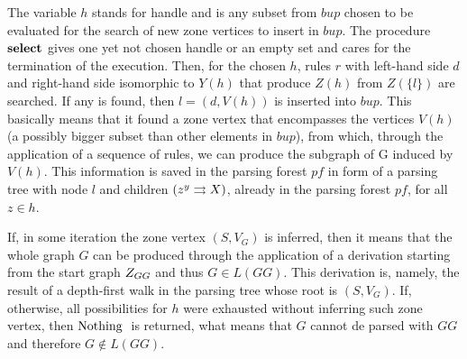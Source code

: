 The variable $h$ stands for handle and is any subset from $bup$ chosen to be evaluated for the search of new zone vertices to insert in $bup$. The procedure $\textbf{select}$ gives one yet not chosen handle or an empty set and cares for the termination of the execution. Then, for the chosen $h$, rules $r$ with left-hand side $d$ and right-hand side isomorphic to $Y(h)$ that produce $Z(h)$ from $Z(\{l\})$ are searched. If any is found, then $l = (d,V(h))$ is inserted into $bup$. This basically means that it found a zone vertex that encompasses the vertices $V(h)$ (a possibly bigger subset than other elements in $bup$), from which, through the application of a sequence of rules, we can produce the subgraph of G induced by $V(h)$. This information is saved in the parsing forest $pf$ in form of a parsing tree with node $l$ and children $\ptree{z}{y}{X}$, already in the parsing forest $pf$, for all $z \in h$.

If, in some iteration the zone vertex $(S, V_G)$ is inferred, then it means that the whole graph $G$ can be produced through the application of a derivation starting from the start graph $Z_{GG}$ and thus $G \in L(GG)$. This derivation is, namely, the result of a depth-first walk in the parsing tree whose root is $(S, V_G)$. If, otherwise, all possibilities for $h$ were exhausted without inferring such zone vertex, then $\operatorname{\text{Nothing}}\;$ is returned, what means that $G$ cannot de parsed with $GG$ and therefore $G \notin L(GG)$.



